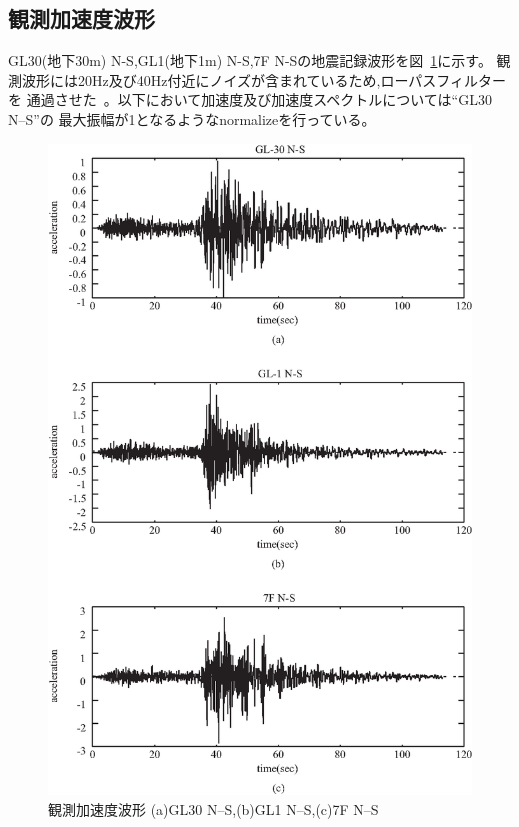 \documentclass[titlepage]{jsarticle}
\begin{document}
\subsection{観測加速度波形}
GL30(地下30m) N-S,GL1(地下1m) N-S,7F N-Sの地震記録波形を図~\ref{kasokudo1}に示す。
観測波形には20Hz及び40Hz付近にノイズが含まれているため,ローパスフィルターを
通過させた~\cite{filter}。以下において加速度及び加速度スペクトルについては``GL30 N--S''の
最大振幅が1となるようなnormalizeを行っている。

\begin{figure}[htbp]
\begin{center}
\includegraphics[scale=0.8]{acc.eps}
\caption[観測加速度波形]{観測加速度波形 (a)GL30 N--S,(b)GL1 N--S,(c)7F N--S}
\label{kasokudo1}
\end{center}
\end{figure}
\end{document}
